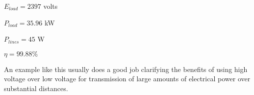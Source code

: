 \item {} $E_{load} = 2397$ volts
\item {} $P_{load} = 35.96$ kW
\item {} $P_{lines} = 45$ W
\item {} $\eta = 99.88 \%$ 
\medskip







An example like this usually does a good job clarifying the benefits of using high voltage over low voltage for transmission of large amounts of electrical power over substantial distances.





